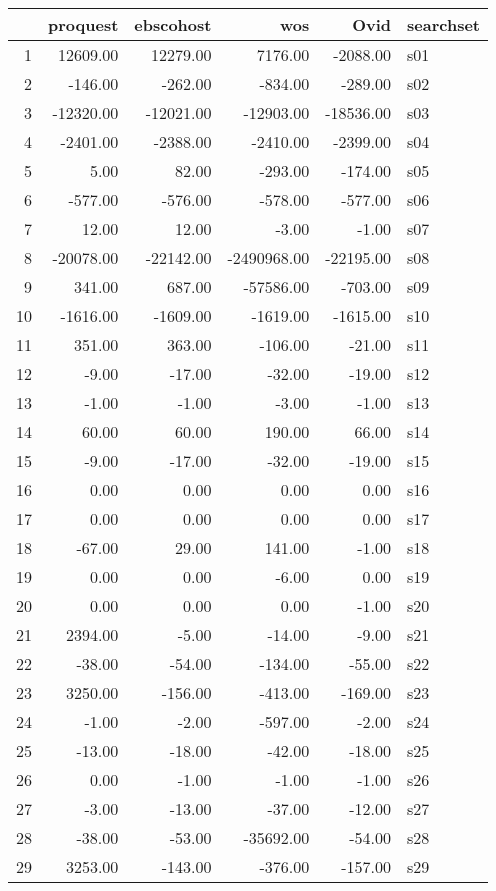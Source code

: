 \begin{table}[ht]
\centering
\begin{tabular}{rrrrrl}
  \hline
 & proquest & ebscohost & wos & Ovid & searchset \\ 
  \hline
1 & 12609.00 & 12279.00 & 7176.00 & -2088.00 & s01 \\ 
  2 & -146.00 & -262.00 & -834.00 & -289.00 & s02 \\ 
  3 & -12320.00 & -12021.00 & -12903.00 & -18536.00 & s03 \\ 
  4 & -2401.00 & -2388.00 & -2410.00 & -2399.00 & s04 \\ 
  5 & 5.00 & 82.00 & -293.00 & -174.00 & s05 \\ 
  6 & -577.00 & -576.00 & -578.00 & -577.00 & s06 \\ 
  7 & 12.00 & 12.00 & -3.00 & -1.00 & s07 \\ 
  8 & -20078.00 & -22142.00 & -2490968.00 & -22195.00 & s08 \\ 
  9 & 341.00 & 687.00 & -57586.00 & -703.00 & s09 \\ 
  10 & -1616.00 & -1609.00 & -1619.00 & -1615.00 & s10 \\ 
  11 & 351.00 & 363.00 & -106.00 & -21.00 & s11 \\ 
  12 & -9.00 & -17.00 & -32.00 & -19.00 & s12 \\ 
  13 & -1.00 & -1.00 & -3.00 & -1.00 & s13 \\ 
  14 & 60.00 & 60.00 & 190.00 & 66.00 & s14 \\ 
  15 & -9.00 & -17.00 & -32.00 & -19.00 & s15 \\ 
  16 & 0.00 & 0.00 & 0.00 & 0.00 & s16 \\ 
  17 & 0.00 & 0.00 & 0.00 & 0.00 & s17 \\ 
  18 & -67.00 & 29.00 & 141.00 & -1.00 & s18 \\ 
  19 & 0.00 & 0.00 & -6.00 & 0.00 & s19 \\ 
  20 & 0.00 & 0.00 & 0.00 & -1.00 & s20 \\ 
  21 & 2394.00 & -5.00 & -14.00 & -9.00 & s21 \\ 
  22 & -38.00 & -54.00 & -134.00 & -55.00 & s22 \\ 
  23 & 3250.00 & -156.00 & -413.00 & -169.00 & s23 \\ 
  24 & -1.00 & -2.00 & -597.00 & -2.00 & s24 \\ 
  25 & -13.00 & -18.00 & -42.00 & -18.00 & s25 \\ 
  26 & 0.00 & -1.00 & -1.00 & -1.00 & s26 \\ 
  27 & -3.00 & -13.00 & -37.00 & -12.00 & s27 \\ 
  28 & -38.00 & -53.00 & -35692.00 & -54.00 & s28 \\ 
  29 & 3253.00 & -143.00 & -376.00 & -157.00 & s29 \\ 
   \hline
\end{tabular}
\end{table}
